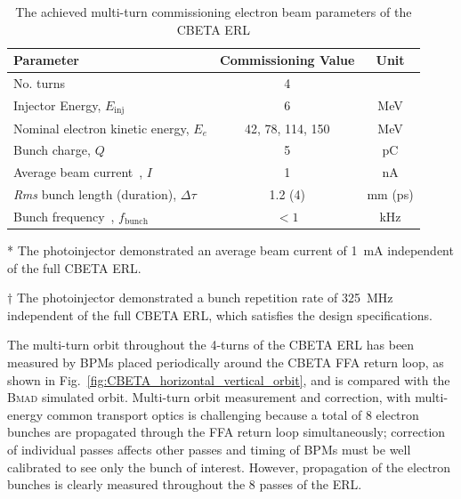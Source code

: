 \documentclass[../main.tex]{subfiles}
\begin{document}
\begin{table}[!h]
\centering
\caption{The achieved multi-turn commissioning electron beam parameters of the CBETA ERL\cite{bartnik}}
\vspace{3mm}
\begin{threeparttable}
\begin{tabular}{lcc}
\hline\hline
Parameter & Commissioning Value & Unit \\
\hline
No. turns & 4 &  \\
Injector Energy, $E_{\mathrm{inj}}$ & 6 & \si{\mega\electronvolt} \\
Nominal electron kinetic energy, $E_{e}$ & 42, 78, 114, 150 & \si{\mega\electronvolt} \\
Bunch charge, $Q$ & 5 & \si{\pico\coulomb} \\ 
Average beam current\tnote{*}~, $I$ & 1 & \si{\nano\ampere} \\
\textit{Rms} bunch length (duration), $\Delta\tau$ & 1.2 (4) & \si{\milli\meter} (\si{\pico\second}) \\
Bunch frequency\tnote{$\dagger$}~, $f_{\mathrm{bunch}}$ & $< 1$ & \si{\kilo\hertz} \\
\hline
\end{tabular}
\begin{tablenotes}
\item[*]{The photoinjector demonstrated an average beam current of 1~\si{\milli\ampere} independent of the full CBETA ERL.}
\item[$\dagger$]{The photoinjector demonstrated a bunch repetition rate of 325~\si{\mega\hertz} independent of the full CBETA ERL, which satisfies the design specifications.}
\end{tablenotes}
\end{threeparttable}
\label{tab:CBETA_ERL_commissioning_parameters}
\end{table}

The multi-turn orbit throughout the 4-turns of the CBETA ERL has been measured by BPMs placed periodically around the CBETA FFA return loop, as shown in Fig.~\ref{fig:CBETA_horizontal_vertical_orbit}, and is compared with the \textsc{Bmad} \cite{BmadManual} simulated orbit. Multi-turn orbit measurement and correction, with multi-energy common transport optics is challenging because a total of 8 electron bunches are propagated through the FFA return loop simultaneously; correction of individual passes affects other passes and timing of BPMs must be well calibrated to see only the bunch of interest. However, propagation of the electron bunches is clearly measured throughout the 8 passes of the ERL.
\end{document}
